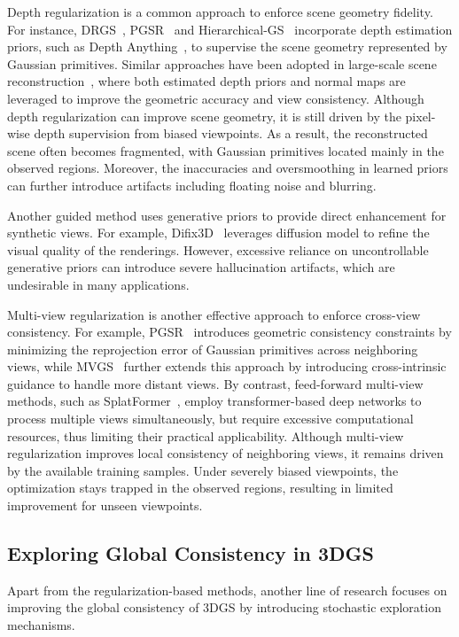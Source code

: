\documentclass[lettersize,journal]{IEEEtran}
\begin{document}
Depth regularization is a common approach to enforce scene geometry fidelity. For instance, DRGS~\cite{drgs}, PGSR~\cite{pgsr} and Hierarchical-GS~\cite{hierarchical} incorporate depth estimation priors, such as Depth Anything~\cite{dav2}, to supervise the scene geometry represented by Gaussian primitives. Similar approaches have been adopted in large-scale scene reconstruction~\cite{hierarchical,citygaussian}, where both estimated depth priors and normal maps are leveraged to improve the geometric accuracy and view consistency. 
Although depth regularization can improve scene geometry, it is still driven by the pixel-wise depth supervision from biased viewpoints. As a result, the reconstructed scene often becomes fragmented, with Gaussian primitives located mainly in the observed regions. Moreover, the inaccuracies and oversmoothing in learned priors can further introduce artifacts including floating noise and blurring.

Another guided method uses generative priors to provide direct enhancement for synthetic views. For example, Difix3D~\cite{difix3d+} leverages diffusion model to refine the visual quality of the renderings. 
However, excessive reliance on uncontrollable generative priors can introduce severe hallucination artifacts, which are undesirable in many applications.

Multi-view regularization is another effective approach to enforce cross-view consistency. For example, 
PGSR~\cite{pgsr} introduces geometric consistency constraints by minimizing the reprojection error of Gaussian primitives across neighboring views, 
while MVGS~\cite{mvgs} further extends this approach by introducing cross-intrinsic guidance to handle more distant views. 
By contrast, feed-forward multi-view methods, such as SplatFormer~\cite{splatformer}, employ transformer-based deep networks to process multiple views simultaneously, but require excessive computational resources, thus limiting their practical applicability.
Although multi-view regularization improves local consistency of neighboring views, it remains driven by the available training samples. Under severely biased viewpoints, the optimization stays trapped in the observed regions, resulting in limited improvement for unseen viewpoints.


\subsection{Exploring Global Consistency in 3DGS}

Apart from the regularization-based methods, another line of research focuses on improving the global consistency of 3DGS by introducing stochastic exploration mechanisms. 
\end{document}

